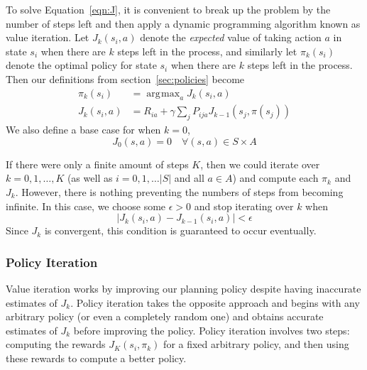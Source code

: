\documentclass[tog]{acmsiggraph}
\DeclareMathOperator*{\argmax}{\arg\!\max}
\begin{document}
To solve Equation~\ref{eqn:J}, it is convenient to break up the problem by the number 
of steps left and then apply a dynamic programming algorithm known as value iteration. 
Let $J_k \left( s_i, a \right)$ denote the \textit{expected} value of taking action $a$ 
in state $s_i$ when there are $k$ steps left in the process, and similarly let 
$\pi_k \left(s_i \right)$ denote the optimal policy for state $s_i$ when there are $k$ steps 
left in the process. Then our definitions from section~\ref{sec:policies} become
\begin{equation*}
  \begin{split}
    \pi_k \left(s_i \right) &= \argmax_a J_k \left( s_i, a \right) \\
    J_k \left( s_i, a \right) &= R_{ia} + \gamma \sum_j P_{ija} J_{k-1} \left( s_j, \pi \left( s_j \right) \right)
  \end{split}
\end{equation*}
We also define a base case for when $k=0$,
\begin{equation*}
  J_0 \left( s, a \right) = 0 \quad \forall \left( s, a \right) \in S \times A
\end{equation*}

If there were only a finite amount of steps $K$, then we could iterate over $k = 0, 1, \ldots, K$ 
(as well as $i = 0, 1, \ldots |S|$ and all $a \in A$) and compute each $\pi_k$ and $J_k$.
 However, there is nothing preventing the numbers of steps from becoming infinite. 
In this case, we choose some $\epsilon > 0$ and stop iterating over $k$ when
\begin{equation*}
  \left| J_k\left( s_i, a \right) - J_{k-1}\left( s_i, a \right) \right| < \epsilon
\end{equation*}
Since $J_k$ is convergent, this condition is guaranteed to occur eventually.

\subsubsection{Policy Iteration}

Value iteration works by improving our planning policy despite having inaccurate 
estimates of $J_k$. Policy iteration takes the opposite approach and begins with 
any arbitrary policy (or even a completely random one) and obtains accurate estimates 
of $J_k$ before improving the policy. Policy iteration involves two steps: computing 
the rewards $J_K \left(s_i, \pi_k \right)$ for a fixed arbitrary policy, and then 
using these rewards to compute a better policy.
\end{document}
